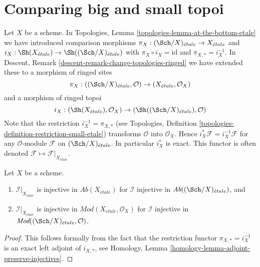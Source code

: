 \section{Comparing big and small topoi}
\label{section-compare}

\noindent
Let $X$ be a scheme. In
Topologies, Lemma \ref{topologies-lemma-at-the-bottom-etale}
we have introduced comparison morphisms
$\pi_X : (\Sch/X)_{\acute{e}tale} \to X_{\acute{e}tale}$ and
$i_X : \Sh(X_{\acute{e}tale}) \to \Sh((\Sch/X)_{\acute{e}tale})$
with $\pi_X \circ i_X = \text{id}$ and $\pi_{X, *} = i_X^{-1}$.
In
Descent, Remark \ref{descent-remark-change-topologies-ringed}
we have extended these to a morphism of ringed sites
$$
\pi_X : ((\Sch/X)_{\acute{e}tale}, \mathcal{O})
\to
(X_{\acute{e}tale}, \mathcal{O}_X)
$$
and a morphism of ringed topoi
$$
i_X : (\Sh(X_{\acute{e}tale}), \mathcal{O}_X) \to
(\Sh((\Sch/X)_{\acute{e}tale}), \mathcal{O})
$$
Note that the restriction $i_X^{-1} = \pi_{X, *}$ (see
Topologies, Definition \ref{topologies-definition-restriction-small-etale})
transforms $\mathcal{O}$ into $\mathcal{O}_X$. Hence
$i_X^*\mathcal{F} = i_X^{-1}\mathcal{F}$ for any $\mathcal{O}$-module
$\mathcal{F}$ on $(\Sch/X)_{\acute{e}tale}$. In particular $i_X^*$ is
exact. This functor is often denoted
$\mathcal{F} \mapsto \mathcal{F}|_{X_{\acute{e}tale}}$.

\begin{lemma}
\label{lemma-compare-injectives}
Let $X$ be a scheme.
\begin{enumerate}
\item $\mathcal{I}|_{X_{\acute{e}tale}}$ is injective in
$\textit{Ab}(X_{\acute{e}tale})$ for $\mathcal{I}$ injective in
$\textit{Ab}((\Sch/X)_{\acute{e}tale})$, and
\item $\mathcal{I}|_{X_{\acute{e}tale}}$ is injective in
$\textit{Mod}(X_{\acute{e}tale}, \mathcal{O}_X)$
for $\mathcal{I}$ injective in
$\textit{Mod}((\Sch/X)_{\acute{e}tale}, \mathcal{O})$.
\end{enumerate}
\end{lemma}

\begin{proof}
This follows formally from the fact that the restriction functor
$\pi_{X, *} = i_X^{-1}$ is an exact left adjoint of $i_{X, *}$, see
Homology, Lemma \ref{homology-lemma-adjoint-preserve-injectives}.
\end{proof}

